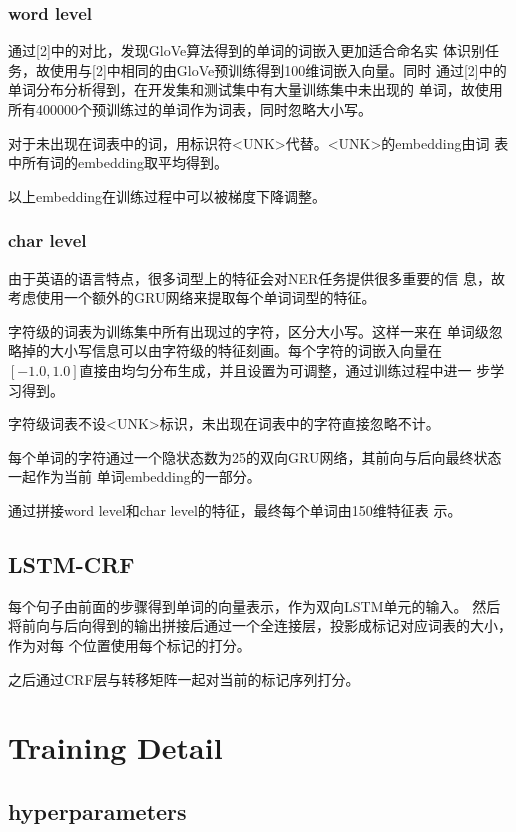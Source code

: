 \documentclass{article} %
\begin{document}
\subsubsection{word level}
\qquad 通过[2]中的对比，发现GloVe算法得到的单词的词嵌入更加适合命名实
体识别任务，故使用与[2]中相同的由GloVe预训练得到100维词嵌入向量。同时
通过[2]中的单词分布分析得到，在开发集和测试集中有大量训练集中未出现的
单词，故使用所有400000个预训练过的单词作为词表，同时忽略大小写。

\qquad 对于未出现在词表中的词，用标识符<UNK>代替。<UNK>的embedding由词
表中所有词的embedding取平均得到。

\qquad 以上embedding在训练过程中可以被梯度下降调整。

\subsubsection{char level}
\qquad 由于英语的语言特点，很多词型上的特征会对NER任务提供很多重要的信
息，故考虑使用一个额外的GRU网络来提取每个单词词型的特征。

\qquad 字符级的词表为训练集中所有出现过的字符，区分大小写。这样一来在
单词级忽略掉的大小写信息可以由字符级的特征刻画。每个字符的词嵌入向量在
$[-1.0, 1.0]$直接由均匀分布生成，并且设置为可调整，通过训练过程中进一
步学习得到。

\qquad 字符级词表不设<UNK>标识，未出现在词表中的字符直接忽略不计。

\qquad 每个单词的字符通过一个隐状态数为25的双向GRU网络，其前向与后向最终状态一起作为当前
单词embedding的一部分。

\qquad 通过拼接word level和char level的特征，最终每个单词由150维特征表
示。

\subsection{LSTM-CRF}
\qquad 每个句子由前面的步骤得到单词的向量表示，作为双向LSTM单元的输入。
然后将前向与后向得到的输出拼接后通过一个全连接层，投影成标记对应词表的大小，作为对每
个位置使用每个标记的打分。

\qquad 之后通过CRF层与转移矩阵一起对当前的标记序列打分。


\section{Training Detail}

\subsection{hyperparameters}
\end{document}
